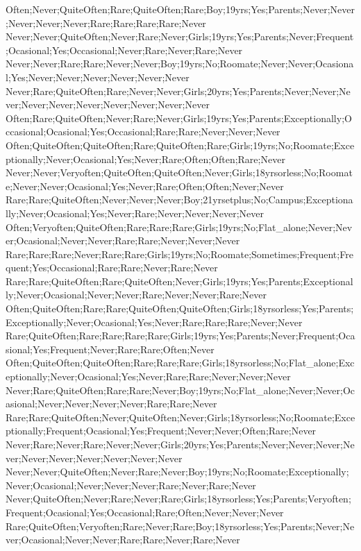Often;Never;QuiteOften;Rare;QuiteOften;Rare;Boy;19yrs;Yes;Parents;Never;Never;Never;Never;Never;Rare;Rare;Rare;Rare;Never
Never;Never;QuiteOften;Never;Rare;Never;Girls;19yrs;Yes;Parents;Never;Frequent;Ocasional;Yes;Occasional;Never;Rare;Never;Rare;Never
Never;Never;Rare;Rare;Never;Never;Boy;19yrs;No;Roomate;Never;Never;Ocasional;Yes;Never;Never;Never;Never;Never;Never
Never;Rare;QuiteOften;Rare;Never;Never;Girls;20yrs;Yes;Parents;Never;Never;Never;Never;Never;Never;Never;Never;Never;Never
Often;Rare;QuiteOften;Never;Rare;Never;Girls;19yrs;Yes;Parents;Exceptionally;Occasional;Ocasional;Yes;Occasional;Rare;Rare;Never;Never;Never
Often;QuiteOften;QuiteOften;Rare;QuiteOften;Rare;Girls;19yrs;No;Roomate;Exceptionally;Never;Ocasional;Yes;Never;Rare;Often;Often;Rare;Never
Never;Never;Veryoften;QuiteOften;QuiteOften;Never;Girls;18yrsorless;No;Roomate;Never;Never;Ocasional;Yes;Never;Rare;Often;Often;Never;Never
Rare;Rare;QuiteOften;Never;Never;Never;Boy;21yrsetplus;No;Campus;Exceptionally;Never;Ocasional;Yes;Never;Rare;Never;Never;Never;Never
Often;Veryoften;QuiteOften;Rare;Rare;Rare;Girls;19yrs;No;Flat_alone;Never;Never;Ocasional;Never;Never;Rare;Rare;Never;Never;Never
Rare;Rare;Rare;Never;Rare;Rare;Girls;19yrs;No;Roomate;Sometimes;Frequent;Frequent;Yes;Occasional;Rare;Rare;Never;Rare;Never
Rare;Rare;QuiteOften;Rare;QuiteOften;Never;Girls;19yrs;Yes;Parents;Exceptionally;Never;Ocasional;Never;Never;Rare;Never;Never;Rare;Never
Often;QuiteOften;Rare;Rare;QuiteOften;QuiteOften;Girls;18yrsorless;Yes;Parents;Exceptionally;Never;Ocasional;Yes;Never;Rare;Rare;Rare;Never;Never
Rare;QuiteOften;Rare;Rare;Rare;Rare;Girls;19yrs;Yes;Parents;Never;Frequent;Ocasional;Yes;Frequent;Never;Rare;Rare;Often;Never
Often;QuiteOften;QuiteOften;Rare;Rare;Rare;Girls;18yrsorless;No;Flat_alone;Exceptionally;Never;Ocasional;Yes;Never;Rare;Rare;Never;Never;Never
Never;Rare;QuiteOften;Rare;Rare;Never;Boy;19yrs;No;Flat_alone;Never;Never;Ocasional;Never;Never;Never;Never;Rare;Rare;Never
Rare;Rare;QuiteOften;Never;QuiteOften;Never;Girls;18yrsorless;No;Roomate;Exceptionally;Frequent;Ocasional;Yes;Frequent;Never;Never;Often;Rare;Never
Never;Rare;Never;Rare;Never;Never;Girls;20yrs;Yes;Parents;Never;Never;Never;Never;Never;Never;Never;Never;Never;Never
Never;Never;QuiteOften;Never;Rare;Never;Boy;19yrs;No;Roomate;Exceptionally;Never;Ocasional;Never;Never;Never;Rare;Never;Rare;Never
Never;QuiteOften;Never;Rare;Never;Rare;Girls;18yrsorless;Yes;Parents;Veryoften;Frequent;Ocasional;Yes;Occasional;Rare;Often;Never;Never;Never
Rare;QuiteOften;Veryoften;Rare;Never;Rare;Boy;18yrsorless;Yes;Parents;Never;Never;Ocasional;Never;Never;Rare;Rare;Never;Rare;Never
